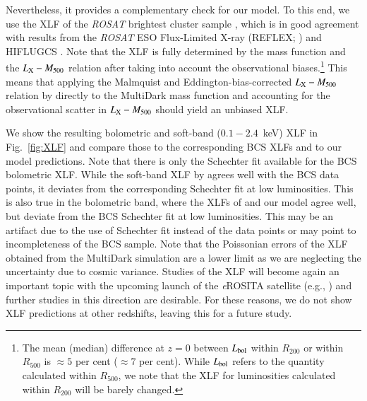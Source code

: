\documentclass[useAMS,usenatbib]{mn2e}
\begin{document}
Nevertheless, it provides a complementary check for our model. To this end, we
use the XLF of the \emph{ROSAT} brightest cluster sample
\citep[BCS][]{1997ApJ...479L.101E}, which is in good agreement with results from
the \emph{ROSAT} ESO Flux-Limited X-ray (REFLEX; \citealp{2002ApJ...566...93B})
and HIFLUGCS \citep{2002ApJ...567..716R}.  Note that the XLF is fully determined
by the mass function and the $L_{{\mathrm{X}}}-M_{500}$ relation after taking into
account the observational biases.\footnote{The mean (median) difference at $z=0$
  between $L_{{\mathrm{bol}}}$ within $R_{200}$ or within $R_{500}$ is $\approx 5$
  per cent ($\approx 7$ per cent). While $L_{{\mathrm{bol}}}$ refers to the quantity
  calculated within $R_{500}$, we note that the XLF for luminosities calculated
  within $R_{200}$ will be barely changed.} This means that applying the
Malmquist and Eddington-bias-corrected $L_{{\mathrm{X}}}-M_{500}$ relation by
\cite{2010MNRAS.406.1773M} directly to the MultiDark mass function and
accounting for the observational scatter in $L_{{\mathrm{X}}}-M_{500}$ should yield
an unbiased XLF.

We show the resulting bolometric and soft-band ($0.1-2.4$~keV) XLF in
Fig.~\ref{fig:XLF} and compare those to the corresponding BCS XLFs and to our
model predictions. Note that there is only the Schechter fit available for the
BCS bolometric XLF.  While the soft-band XLF by \cite{2010MNRAS.406.1773M}
agrees well with the BCS data points, it deviates from the corresponding
Schechter fit at low luminosities. This is also true in the bolometric band,
where the XLFs of \cite{2010MNRAS.406.1773M} and our model agree well, but
deviate from the BCS Schechter fit at low luminosities. This may be an artifact
due to the use of Schechter fit instead of the data points or may point to
incompleteness of the BCS sample. Note that the Poissonian errors of the XLF
obtained from the MultiDark simulation are a lower limit as we are neglecting
the uncertainty due to cosmic variance.  Studies of the XLF will become again an
important topic with the upcoming launch of the \emph{e}ROSITA satellite (e.g.,
\citealp{2011MSAIS..17..159C}) and further studies in this direction are
desirable. For these reasons, we do not show XLF predictions at other redshifts,
leaving this for a future study.


\end{document}
